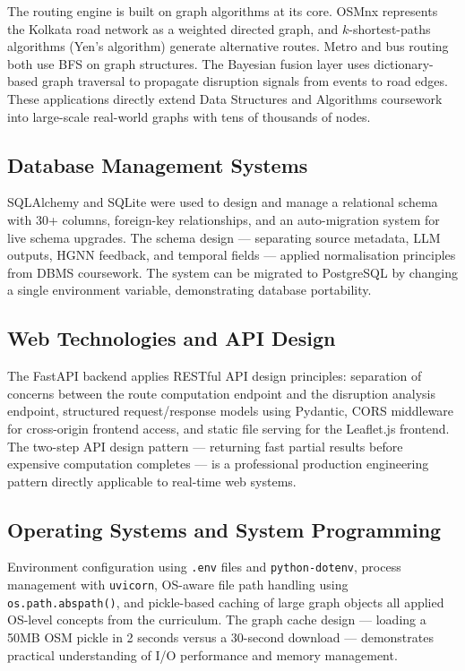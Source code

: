 \documentclass[12pt, a4paper]{report}
\begin{document}
The routing engine is built on graph algorithms at its core. OSMnx represents the Kolkata road network as a weighted directed graph, and $k$-shortest-paths algorithms (Yen's algorithm) generate alternative routes. Metro and bus routing both use BFS on graph structures. The Bayesian fusion layer uses dictionary-based graph traversal to propagate disruption signals from events to road edges. These applications directly extend Data Structures and Algorithms coursework into large-scale real-world graphs with tens of thousands of nodes.

\subsection*{Database Management Systems}

SQLAlchemy and SQLite were used to design and manage a relational schema with 30+ columns, foreign-key relationships, and an auto-migration system for live schema upgrades. The schema design — separating source metadata, LLM outputs, HGNN feedback, and temporal fields — applied normalisation principles from DBMS coursework. The system can be migrated to PostgreSQL by changing a single environment variable, demonstrating database portability.

\subsection*{Web Technologies and API Design}

The FastAPI backend applies RESTful API design principles: separation of concerns between the route computation endpoint and the disruption analysis endpoint, structured request/response models using Pydantic, CORS middleware for cross-origin frontend access, and static file serving for the Leaflet.js frontend. The two-step API design pattern — returning fast partial results before expensive computation completes — is a professional production engineering pattern directly applicable to real-time web systems.

\subsection*{Operating Systems and System Programming}

Environment configuration using \texttt{.env} files and \texttt{python-dotenv}, process management with \texttt{uvicorn}, OS-aware file path handling using \texttt{os.path.abspath()}, and pickle-based caching of large graph objects all applied OS-level concepts from the curriculum. The graph cache design — loading a 50MB OSM pickle in 2 seconds versus a 30-second download — demonstrates practical understanding of I/O performance and memory management.
\end{document}
